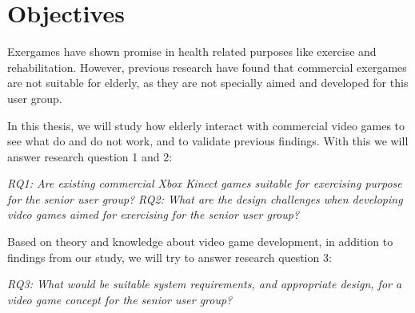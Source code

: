 \section{Objectives}
\label{sec:researchq} Exergames have shown promise in health related purposes like exercise and rehabilitation. However, previous research have found that commercial exergames are not suitable for elderly, as they are not specially aimed and developed for this user group. 

In this thesis, we will study how elderly interact with commercial video games to see what do and do not work, and to validate previous findings. With this we will answer research question 1 and 2: 

\emph{RQ1: Are existing commercial Xbox Kinect games suitable for exercising purpose for the senior user group?} 
\emph{RQ2: What are the design challenges when developing video games aimed for exercising for the senior user group?}

Based on theory and knowledge about video game development, in addition to findings from our study, we will try to answer research question 3:

\emph{RQ3: What would be suitable system requirements, and appropriate design, for a video game concept for the senior user group?}

